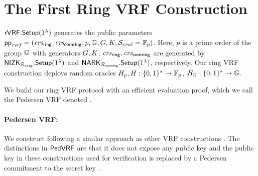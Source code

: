 
\def\tmpaux{\aux \doubleplus \piring \doubleplus \comring}
\def\tmpeprintaux{\eprint{\aux'}{\tmpaux}}
\def\tmpindent{\hspace*{5pt}}
\section{The First Ring VRF Construction}%
\label{sec:pederson_vrf}



$ {\mathsf{rVRF}}.{\mathsf{Setup}}(1^\lambda) $ generates the public parameters $ \mathsf{pp}_{\mathit{rvrf}} = (\mathit{crs_{\mathsf{ring}}},\mathit{crs_{\mathsf{comring}}}, p,{\mathbb{G}}, G,K, {\mathcal{S}}_{eval}  = \mathbb{F}_p)$. Here, $ p $ is a prime order of the group $ {\mathbb{G}} $ with generators $ G,K $.  $ \mathit{crs_{\mathsf{ring}}}, \mathit{crs_{\mathsf{comring}}} $ are generated by $ {\mathsf{NIZK}}_{\mathcal{R}_{\mathtt{ring}}}.{\mathsf{Setup}}(1^\lambda) $ and $ \mathsf{NARK}_{\mathcal{R}_{\mathsf{comring}}}.{\mathsf{Setup}}(1^\lambda) $, respectively. Our ring VRF construction deploys random oracles $H_p,H: \{0,1\}^* \to \mathbb{F}_p$, $H_{{\mathbb{G}}}: \{0,1\}^* \to {\mathbb{G}}$.


We build our  ring VRF protocol with an efficient evaluation proof, which
we call the Pedersen VRF  denoted \PedVRF.




\paragraph{Pedersen VRF:} 
We construct \PedVRF following a similar approach as  other VRF constructions
\cite{nsec5,VXEd25519,draft-irtf-cfrg-vrf-10}. The distinctions in $ {\mathsf{PedVRF}} $ are that it does not expose any public key and the public key in these constructions used for verification is replaced  by a Pedersen commitment to the secret key \sk.

